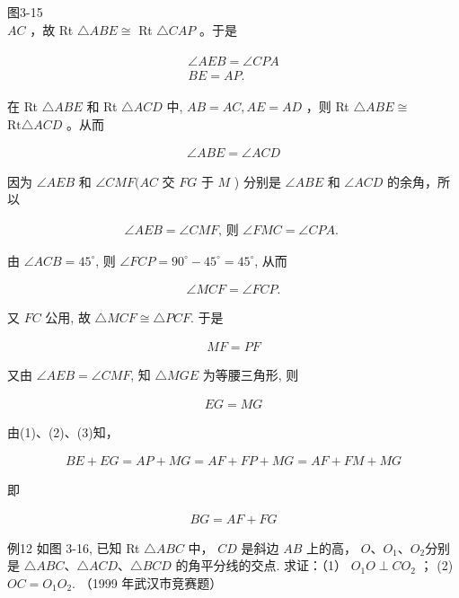 \documentclass[10pt]{article}
\begin{document}
图3-15\\
$A C$ ，故 Rt $\triangle A B E \cong$ Rt $\triangle C A P$ 。于是

\begin{align*}
\begin{gather*}
\angle A E B=\angle C P A \\
B E=A P .
\end{gather*} \tag{1}
\end{align*}

在 Rt $\triangle A B E$ 和 Rt $\triangle A C D$ 中, $A B=A C, A E=A D$ ，则 Rt $\triangle A B E \cong$ $\mathrm{Rt} \triangle A C D$ 。从而

\begin{align*}
\angle A B E=\angle A C D
\end{align*}

因为 $\angle A E B$ 和 $\angle C M F(A C$ 交 $F G$ 于 $M$ ) 分别是 $\angle A B E$ 和 $\angle A C D$ 的余角，所以

\begin{align*}
\angle A E B=\angle C M F \text {, 则 } \angle F M C=\angle C P A \text {. }
\end{align*}

由 $\angle A C B=45^{\circ}$, 则 $\angle F C P=90^{\circ}-45^{\circ}=45^{\circ}$, 从而

\begin{align*}
\angle M C F=\angle F C P .
\end{align*}

又 $F C$ 公用, 故 $\triangle M C F \cong \triangle P C F$. 于是

\begin{align*}
M F=P F \tag{2}
\end{align*}

又由 $\angle A E B=\angle C M F$, 知 $\triangle M G E$ 为等腰三角形, 则

\begin{align*}
E G=M G \tag{3}
\end{align*}

由(1)、(2)、(3)知，

\begin{align*}
B E+E G=A P+M G=A F+F P+M G=A F+F M+M G
\end{align*}

即

\begin{align*}
B G=A F+F G
\end{align*}

例12 如图 3-16, 已知 Rt $\triangle A B C$ 中， $C D$ 是斜边 $A B$ 上的高， $O 、 O_{1} 、 O_{2}$分别是 $\triangle A B C 、 \triangle A C D 、 \triangle B C D$ 的角平分线的交点. 求证：（1） $O_{1} O \perp C O_{2}$ ； (2) $O C=O_{1} O_{2}$. （1999 年武汉市竞赛题）
\end{document}
